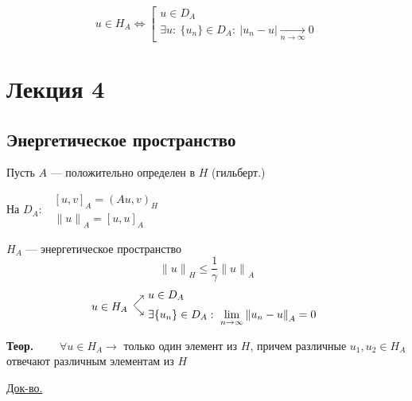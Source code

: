 \documentclass[12pt, a4paper]{article}
\begin{document}
\[ u \in H_A \Leftrightarrow \left[ \begin{array}{l}
	u \in D_A \\
	\exists u : \ \{ u_n \} \in D_A: \ | u_n - u | \underset{n \rightarrow \infty}{\rightarrow} 0
\end{array} \right. \]

\newpage

\section{Лекция 4}

\subsection{Энергетическое пространство}

Пусть $A$ --- положительно определен в $H$ (гильберт.)

На $D_A: \enspace \begin{array}{l}
	{[u, v]}_A = {(A u, v)}_H \\
	{\|u\|}_A = {[u,u]}_A
\end{array} $

$ H_A $ --- энергетическое пространство
\[ {\|u\|}_H \leq \frac{1}{\gamma   } {\|u\|}_A \label{4.0} \tag{4.0} \]
\[ u \in H_A \begin{array}{l@{\ }l}
	\raisebox{-1ex}{$\nearrow$} & u \in D_A \\
	\raisebox{1ex}{$\searrow$} & \exists \{ u_n \} \in D_A: \ \lim\limits_{n \rightarrow \infty} {\|u_n - u\|}_A = 0
\end{array} \]


\textbf{Теор.} $ \qquad \forall u \in H_A \rightarrow $ только один элемент из $H$, причем различные $u_1, u_2 \in H_A$ отвечают различным элементам из $H$

\underline{Док-во.}
\end{document}
